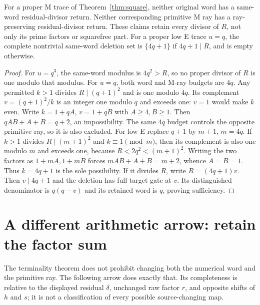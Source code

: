 \begin{theorem}\label{thm:terminal}
For a proper M trace of Theorem~\ref{thm:square}, neither original word has a
same-word residual-divisor return. Neither corresponding primitive M ray has
a ray-preserving residual-divisor return. These claims retain every divisor of
$R$, not only its prime factors or squarefree part.
For a proper low E trace $u=q$, the complete nontrivial same-word deletion set
is $\{4q+1\}$ if $4q+1\mid R$, and is empty otherwise.
\end{theorem}
\begin{proof}
For $u=q^3$, the same-word modulus is $4q^2>R$, so no proper divisor of $R$
is one modulo that modulus. For $u=q$, both word and M-ray budgets are $4q$.
Any permitted $k>1$ divides $R\mid(q+1)^2$ and is one modulo $4q$.
Its complement $v=(q+1)^2/k$ is an integer one modulo $q$ and exceeds one:
$v=1$ would make $k$ even. Write $k=1+qA$, $v=1+qB$ with $A\ge4,B\ge1$.
Then $qAB+A+B=q+2$, an impossibility. The same $4q$ budget controls the
opposite primitive ray, so it is also excluded.
For low E replace $q+1$ by $m+1$, $m=4q$. If $k>1$ divides
$R\mid(m+1)^2$ and $k\equiv1\pmod m$, then its complement is also one
modulo $m$ and exceeds one, because $R<2q^2<(m+1)^2$.
Writing the two factors as $1+mA,1+mB$ forces
$mAB+A+B=m+2$, whence $A=B=1$. Thus $k=4q+1$ is the sole possibility.
If it divides $R$, write $R=(4q+1)v$. Then $v\mid4q+1$ and the deletion
has full target gate at $v$. Its distinguished denominator is $q(q-v)$ and
its retained word is $q$, proving sufficiency.
\end{proof}

\section{A different arithmetic arrow: retain the factor sum}\label{sec:shift}
The terminality theorem does not prohibit changing both the numerical word
and the primitive ray. The following arrow does exactly that.
Its completeness is relative to the displayed residual $\delta$, unchanged
raw factor $r$, and opposite shifts of $h$ and $s$; it is not a classification
of every possible source-changing map.

